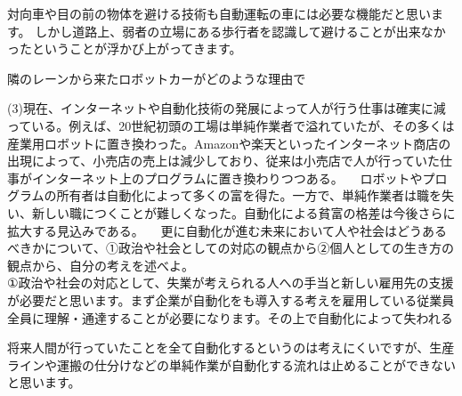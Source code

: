 \documentclass[11pt,a4paper]{jsarticle}
\begin{document}
対向車や目の前の物体を避ける技術も自動運転の車には必要な機能だと思います。
しかし道路上、弱者の立場にある歩行者を認識して避けることが出来なかったということが浮かび上がってきます。

隣のレーンから来たロボットカーがどのような理由で

\newpage
 (3)現在、インターネットや自動化技術の発展によって人が行う仕事は確実に減っている。例えば、20世紀初頭の工場は単純作業者で溢れていたが、その多くは産業用ロボットに置き換わった。Amazonや楽天といったインターネット商店の出現によって、小売店の売上は減少しており、従来は小売店で人が行っていた仕事がインターネット上のプログラムに置き換わりつつある。
　ロボットやプログラムの所有者は自動化によって多くの富を得た。一方で、単純作業者は職を失い、新しい職につくことが難しくなった。自動化による貧富の格差は今後さらに拡大する見込みである。
　更に自動化が進む未来において人や社会はどうあるべきかについて、①政治や社会としての対応の観点から②個人としての生き方の観点から、自分の考えを述べよ。\\
 
①政治や社会の対応として、失業が考えられる人への手当と新しい雇用先の支援が必要だと思います。まず企業が自動化をも導入する考えを雇用している従業員全員に理解・通達することが必要になります。その上で自動化によって失われる

将来人間が行っていたことを全て自動化するというのは考えにくいですが、生産ラインや運搬の仕分けなどの単純作業が自動化する流れは止めることができないと思います。
\end{document}
